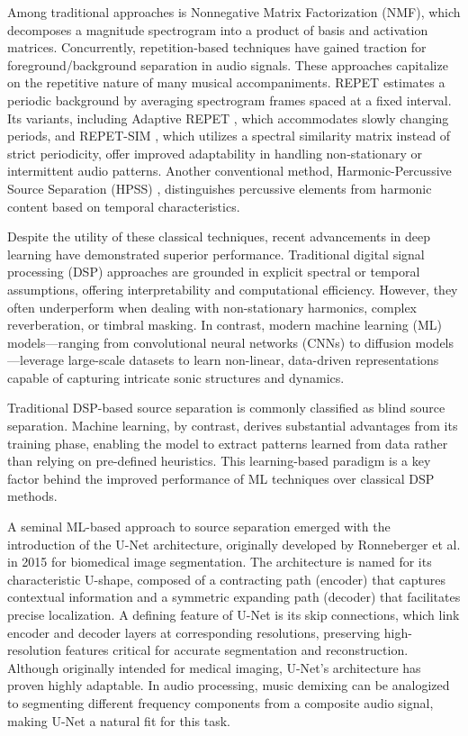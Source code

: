 \documentclass{article}
\begin{document}
\begin{sloppy}
Among traditional approaches is Nonnegative Matrix Factorization (NMF), which decomposes a magnitude spectrogram into a product of basis and activation matrices. Concurrently, repetition-based techniques have gained traction for foreground/background separation in audio signals. These approaches capitalize on the repetitive nature of many musical accompaniments. REPET \cite{rafii2013repet} estimates a periodic background by averaging spectrogram frames spaced at a fixed interval. Its variants, including Adaptive REPET \cite{rafii2013repet}, which accommodates slowly changing periods, and REPET-SIM \cite{rafii2013repet}, which utilizes a spectral similarity matrix instead of strict periodicity, offer improved adaptability in handling non-stationary or intermittent audio patterns. Another conventional method, Harmonic-Percussive Source Separation (HPSS) \cite{hpss}, distinguishes percussive elements from harmonic content based on temporal characteristics.

Despite the utility of these classical techniques, recent advancements in deep learning have demonstrated superior performance. Traditional digital signal processing (DSP) approaches are grounded in explicit spectral or temporal assumptions, offering interpretability and computational efficiency. However, they often underperform when dealing with non-stationary harmonics, complex reverberation, or timbral masking. In contrast, modern machine learning (ML) models—ranging from convolutional neural networks (CNNs) to diffusion models—leverage large-scale datasets to learn non-linear, data-driven representations capable of capturing intricate sonic structures and dynamics.

Traditional DSP-based source separation is commonly classified as blind source separation. Machine learning, by contrast, derives substantial advantages from its training phase, enabling the model to extract patterns learned from data rather than relying on pre-defined heuristics. This learning-based paradigm is a key factor behind the improved performance of ML techniques over classical DSP methods.

A seminal ML-based approach to source separation emerged with the introduction of the U-Net architecture, originally developed by Ronneberger et al. \cite{Unet_medical_segmentation} in 2015 for biomedical image segmentation. The architecture is named for its characteristic U-shape, composed of a contracting path (encoder) that captures contextual information and a symmetric expanding path (decoder) that facilitates precise localization. A defining feature of U-Net is its skip connections, which link encoder and decoder layers at corresponding resolutions, preserving high-resolution features critical for accurate segmentation and reconstruction. Although originally intended for medical imaging, U-Net’s architecture has proven highly adaptable. In audio processing, music demixing can be analogized to segmenting different frequency components from a composite audio signal, making U-Net a natural fit for this task.


\end{sloppy}
\end{document}
